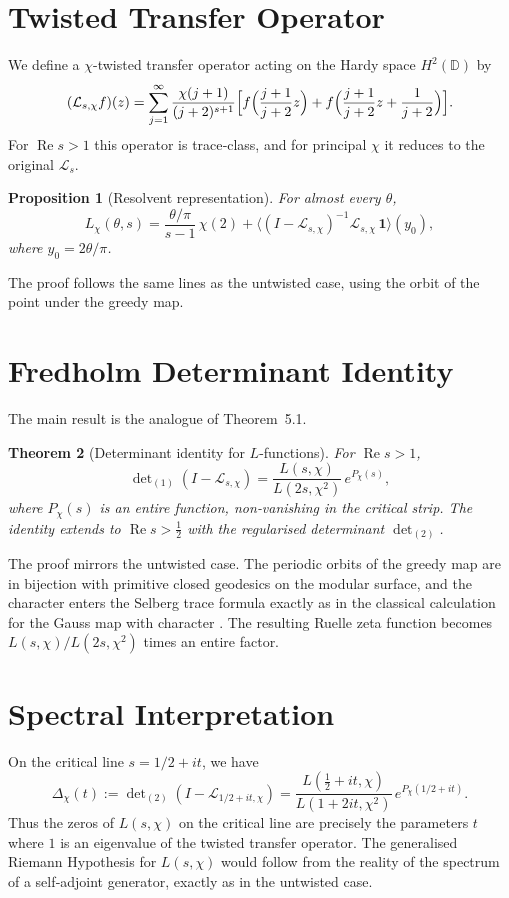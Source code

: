 \documentclass[11pt,a4paper]{article}
\newtheorem{theorem}{Theorem}[section]
\newtheorem{proposition}[theorem]{Proposition}
\begin{document}
\section{Twisted Transfer Operator}
We define a \(\chi\)-twisted transfer operator acting on the Hardy space \(H^2(\mathbb{D})\) by
\[
(\mathcal{L}_{s,\chi}f)(z) = \sum_{j=1}^\infty \frac{\chi(j+1)}{(j+2)^{s+1}}
\Bigl[ f\Bigl(\frac{j+1}{j+2}z\Bigr) + f\Bigl(\frac{j+1}{j+2}z + \frac{1}{j+2}\Bigr) \Bigr].
\label{eq:twistedL}
\]
For \(\operatorname{Re}s>1\) this operator is trace‑class, and for principal \(\chi\) it reduces to the original \(\mathcal{L}_s\).

\begin{proposition}[Resolvent representation]
For almost every \(\theta\),
\[
L_{\chi}(\theta,s) = \frac{\theta/\pi}{s-1}\,\chi(2) + \bigl\langle (I-\mathcal{L}_{s,\chi})^{-1}\mathcal{L}_{s,\chi}\,\mathbf{1}\bigr\rangle(y_0),
\]
where \(y_0 = 2\theta/\pi\).
\end{proposition}
The proof follows the same lines as the untwisted case, using the orbit of the point under the greedy map.

\section{Fredholm Determinant Identity}
The main result is the analogue of Theorem~5.1.

\begin{theorem}[Determinant identity for \(L\)-functions]
For \(\operatorname{Re}s>1\),
\[
\det\nolimits_{(1)}(I-\mathcal{L}_{s,\chi})
= \frac{L(s,\chi)}{L(2s,\chi^2)}\, e^{P_\chi(s)},
\]
where \(P_\chi(s)\) is an entire function, non‑vanishing in the critical strip.  The identity extends to \(\operatorname{Re}s>\frac12\) with the regularised determinant \(\det_{(2)}\).
\end{theorem}

The proof mirrors the untwisted case.  The periodic orbits of the greedy map are in bijection with primitive closed geodesics on the modular surface, and the character enters the Selberg trace formula exactly as in the classical calculation for the Gauss map with character \cite{EfratChars}.  The resulting Ruelle zeta function becomes \(L(s,\chi)/L(2s,\chi^2)\) times an entire factor.

\section{Spectral Interpretation}
On the critical line \(s=1/2+it\), we have
\[
\Delta_\chi(t) := \det\nolimits_{(2)}(I-\mathcal{L}_{1/2+it,\chi})
= \frac{L(\frac12+it,\chi)}{L(1+2it,\chi^2)}\, e^{P_\chi(1/2+it)}.
\]
Thus the zeros of \(L(s,\chi)\) on the critical line are precisely the parameters \(t\) where \(1\) is an eigenvalue of the twisted transfer operator.  The generalised Riemann Hypothesis for \(L(s,\chi)\) would follow from the reality of the spectrum of a self‑adjoint generator, exactly as in the untwisted case.
\end{document}
